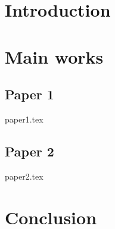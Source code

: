 \documentclass[ %
titlepage,numbers=noenddot,%
                headinclude,footinclude,cleardoublepage=empty,abstract=on,
                BCOR=5mm,paper=a4,fontsize=11pt
                ]{scrreprt}
\theoremstyle{definition}
\begin{document}
\frenchspacing
\raggedbottom
\pagestyle{plain}
% 

% 
\cleardoublepage
\cleardoublepage
\cleardoublepage
\cleardoublepage
\cleardoublepage
\pagestyle{scrheadings}

\clearpairofpagestyles
\ohead{\rightmark}
\cfoot[\pagemark]{\pagemark}

\cleardoublepage
\part{Introduction}\label{pt:intro}



\cleardoublepage
\part{Main works}\label{pt:main}
% 

\chapter{Paper 1}
{paper1.tex}

\chapter{Paper 2}
{paper2.tex}


\cleardoublepage
\part{Conclusion}\label{pt:end}

\end{document}
